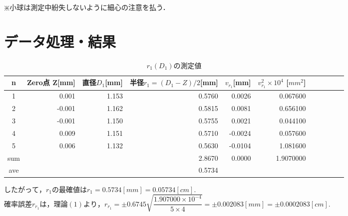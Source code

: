 \documentclass[a4paper,1pt]{jsarticle}
\begin{document}
$\divideontimes $小球は測定中紛失しないように細心の注意を払う．\\



\clearpage


\section{データ処理・結果}



\begin{table}[H]
  \caption{$r_1(D_1)$の測定値}
  \label{table:SpeedOfLight}
  \centering
  \begin{tabular}{|c||r|r|r|r|r|r|r|r|r|r|}
    \hline
    n & Zero点 Z[mm]& 直径$D_1 $[mm] & 半径$r_1=(D_1-Z)/2$[mm] & $v_{r_1}$[mm] & $v_{r_1}^2\times 10^4$ [$mm^2$] \\
    \hline\hline
    1 & 0.001 & 1.153 & 0.5760 & 0.0026 & 0.067600 \\
    2 & -0.001 & 1.162 & 0.5815 & 0.0081 & 0.656100 \\
    3 & -0.001 & 1.150 & 0.5755 & 0.0021 & 0.044100 \\
    4 & 0.009 & 1.151 & 0.5710 & -0.0024 & 0.057600 \\
    5 & 0.006 & 1.132 & 0.5630 & -0.0104 & 1.081600 \\

    \hline\hline
    sum & & & 2.8670 & 0.0000 & 1.9070000 \\
    \hline
    ave & & & 0.5734 & &  \\

    \hline
  \end{tabular}


\end{table}

$したがって，r_1の最確値はr_1=0.5734[mm]=0.05734[cm].$\\

$確率誤差r_{r_1}は，理論(1)より，r_{r_1}=\pm0.6745\sqrt{\dfrac{1.907000\times10^{-4}}{5\times4}}=\pm0.002083[mm]=\pm0.0002083[cm].$
\end{document}
